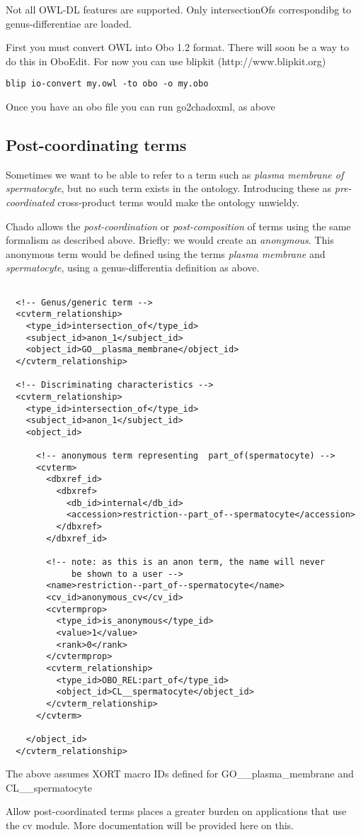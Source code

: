 Not all OWL-DL features are supported. Only intersectionOfs
correspondibg to genus-differentiae are loaded.

First you must convert OWL into Obo 1.2 format. There will soon be a
way to do this in OboEdit. For now you can use blipkit
(http://www.blipkit.org)

\begin{verbatim}
blip io-convert my.owl -to obo -o my.obo
\end{verbatim}

Once you have an obo file you can run go2chadoxml, as above

\subsection{Post-coordinating terms}

Sometimes we want to be able to refer to a term such as {\em plasma
membrane of spermatocyte}, but no such term exists in the
ontology. Introducing these as {\em pre-coordinated} cross-product
terms would make the ontology unwieldy.

Chado allows the {\em post-coordination} or {\em post-composition} of
terms using the same formalism as described above. Briefly: we would
create an {\em anonymous}. This anonymous term would be defined using
the terms {\em plasma membrane} and {\em spermatocyte}, using a
genus-differentia definition as above.

\begin{verbatim}

  <!-- Genus/generic term -->
  <cvterm_relationship>
    <type_id>intersection_of</type_id>
    <subject_id>anon_1</subject_id>
    <object_id>GO__plasma_membrane</object_id>
  </cvterm_relationship>

  <!-- Discriminating characteristics -->
  <cvterm_relationship>
    <type_id>intersection_of</type_id>
    <subject_id>anon_1</subject_id>
    <object_id>

      <!-- anonymous term representing  part_of(spermatocyte) -->
      <cvterm>
        <dbxref_id>
          <dbxref>
            <db_id>internal</db_id>
            <accession>restriction--part_of--spermatocyte</accession>
          </dbxref>
        </dbxref_id>

        <!-- note: as this is an anon term, the name will never
             be shown to a user -->
        <name>restriction--part_of--spermatocyte</name>
        <cv_id>anonymous_cv</cv_id>
        <cvtermprop>
          <type_id>is_anonymous</type_id>
          <value>1</value>
          <rank>0</rank>
        </cvtermprop>
        <cvterm_relationship>
          <type_id>OBO_REL:part_of</type_id>
          <object_id>CL__spermatocyte</object_id>
        </cvterm_relationship>
      </cvterm>

    </object_id>
  </cvterm_relationship>

\end{verbatim}

The above assumes XORT macro IDs defined for GO__plasma_membrane and
CL__spermatocyte


Allow post-coordinated terms places a greater burden on applications
that use the cv module. More documentation will be provided here on
this.
